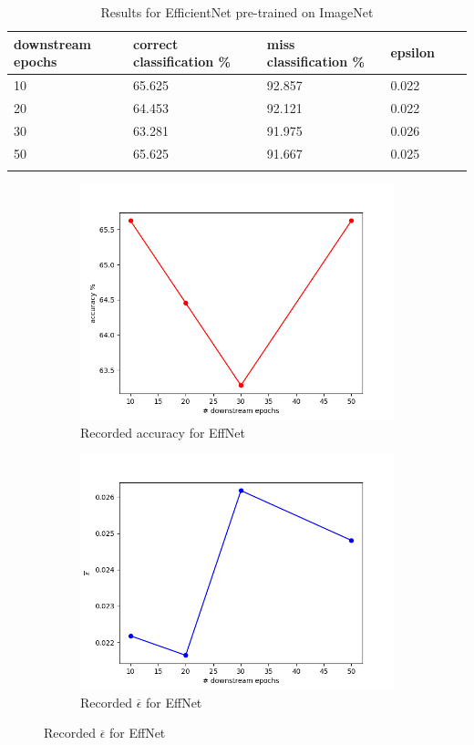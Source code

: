 \begin{longtable}{|| p{} | p{} | p{} | p{} | p{} | p{} ||}
    \hline \hline
    downstream epochs & correct classification \% & miss classification \% & epsilon \\ \hline \hline

    10                & 65.625                    & 92.857                 & 0.022   \\ \hline
    20                & 64.453                    & 92.121                 & 0.022   \\ \hline
    30                & 63.281                    & 91.975                 & 0.026   \\ \hline
    50                & 65.625                    & 91.667                 & 0.025   \\ \hline

    \caption{\label{tab:table3}Results for EfficientNet pre-trained on ImageNet}
\end{longtable}

\begin{figure}[!hb]
    \begin{subfigure}{\textwidth}
        \caption{Recorded accuracy for EffNet}
        \centering
        \includegraphics[width=10cm]{images/effnet_transfer_acc}
    \end{subfigure}
    \begin{subfigure}{\textwidth}
        \caption{Recorded $\overline{\epsilon}$ for EffNet}
        \centering
        \includegraphics[width=10cm]{images/effnet_transfer_eps}
    \end{subfigure}
\end{figure}




